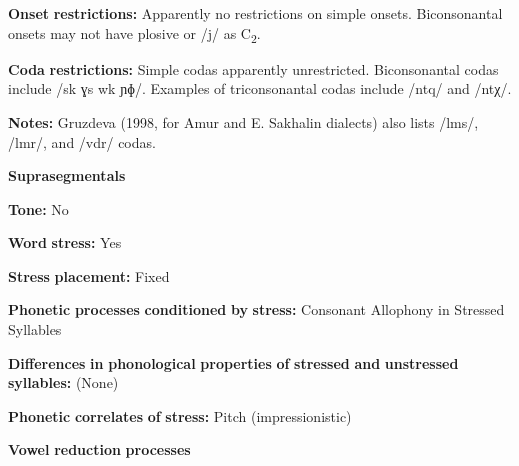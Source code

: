\documentclass[output=paper]{langsci/langscibook}
\begin{document}
\begin{styleBody}
\textbf{Onset} \textbf{restrictions:} Apparently no restrictions on simple onsets. Biconsonantal onsets may not have plosive or /j/ as C\textsubscript{2}.
\end{styleBody}

\begin{styleBody}
\textbf{Coda} \textbf{restrictions:} Simple codas apparently unrestricted. Biconsonantal codas include /sk ɣs wk ɲɸ/. Examples of triconsonantal codas include /ntq/ and /ntχ/.
\end{styleBody}

\begin{styleBody}
\textbf{Notes:} Gruzdeva (1998, for Amur and E. Sakhalin dialects) also lists /lms/, /lmr/, and /vdr/ codas.
\end{styleBody}

\begin{styleBody}
\textbf{Suprasegmentals}
\end{styleBody}

\begin{styleBody}
\textbf{Tone:} No
\end{styleBody}

\begin{styleBody}
\textbf{Word} \textbf{stress:} Yes
\end{styleBody}

\begin{styleBody}
\textbf{Stress} \textbf{placement:} Fixed
\end{styleBody}

\begin{styleBody}
\textbf{Phonetic} \textbf{processes} \textbf{conditioned} \textbf{by} \textbf{stress:} Consonant Allophony in Stressed Syllables
\end{styleBody}

\begin{styleBody}
\textbf{Differences} \textbf{in} \textbf{phonological} \textbf{properties} \textbf{of} \textbf{stressed} \textbf{and} \textbf{unstressed} \textbf{syllables:} (None)
\end{styleBody}

\begin{styleBody}
\textbf{Phonetic} \textbf{correlates} \textbf{of} \textbf{stress:} Pitch (impressionistic)
\end{styleBody}

\begin{styleBody}
\textbf{Vowel} \textbf{reduction} \textbf{processes}
\end{styleBody}
\end{document}
